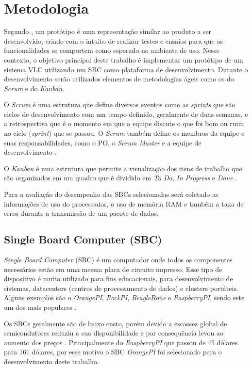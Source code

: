 \chapter{Metodologia}

Segundo , um protótipo é uma representação similar ao produto a ser desenvolvido, criado com o intuito de realizar testes e ensaios para que as funcionalidades se comportem como esperado no ambiente de uso. Nesse contexto, o objetivo principal deste trabalho é implementar um protótipo de um sistema VLC utilizando um SBC como plataforma de desenvolvimento. Durante o desenvolvimento serão utilizados elementos de metodologias ágeis como os do \textit{Scrum} e do \textit{Kanban}.

O \textit{Scrum} é uma estrutura que define diversos eventos como as \textit{sprints} que são ciclos de desenvolvimento com um tempo definido, geralmente de duas semanas, e a retrospectiva que é o momento em que a equipe discute o que foi bom ou ruim no ciclo (\textit{sprint}) que se passou. O \textit{Scrum} também define os membros da equipe e suas responsabilidades, como o PO, o \textit{Scrum Master} e a equipe de desenvolvimento \cite{scrum}. 

O \textit{Kanban} é uma estrutura que permite a visualização dos itens de trabalho que são organizados em um quadro que é dividido em \textit{To Do}, \textit{In Progress} e \textit{Done} \cite{kanbam}.

Para a avaliação do desempenho das SBCs selecionadas será coletado as informações de uso do processador, o uso de memória RAM e também a taxa de erros durante a transmissão de um pacote de dados.

\section{Single Board Computer (SBC)}

\textit{Single Board Computer} (SBC) é um computador onde todos os componentes necessários estão em uma mesma placa de circuito impresso. Esse tipo de dispositivo é muito utilizado para fins educacionais, para desenvolvimento de sistemas, datacenters (centros  de  processamento  de  dados) e clusters portáteis. Alguns exemplos são o \textit{OrangePI}, \textit{RockPI}, \textit{BeagleBone} e \textit{RaspberryPI}, sendo este um dos mais populares \cite{SBC_edu}.

Os SBCs geralmente são de baixo custo, porém devido a escassez global de semicondutores reduziu a sua disponibilidade e por consequência levou ao aumento dos preços \cite{zeng_2022}. Principalmente do \textit{RaspberryPI} que passou de 45 dólares para 161 dólares, por esse motivo o SBC \textit{OrangePI} foi selecionado para o desenvolvimento deste trabalho.

